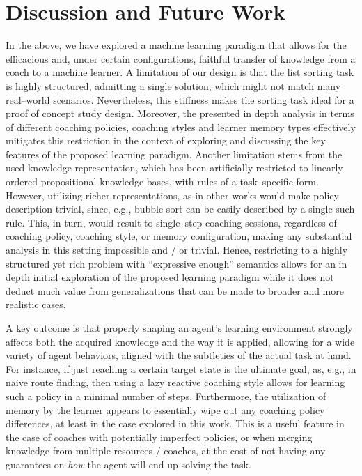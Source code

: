 \documentclass[a4paper,twoside]{article}
\begin{document}
\section{Discussion and Future Work}\label{sec:discussion-and-future-work}
%
In the above, we have explored a machine learning paradigm that allows for the efficacious and, under certain configurations, faithful transfer of knowledge from a coach to a machine learner. A limitation of our design is that the list sorting task is highly structured, admitting a single solution, which might not match many real--world scenarios. Nevertheless, this stiffness makes the sorting task ideal for a proof of concept study design. Moreover, the presented in depth analysis in terms of different coaching policies, coaching styles and learner memory types effectively mitigates this restriction in the context of exploring and discussing the key features of the proposed learning paradigm. Another limitation stems from the used knowledge representation, which has been artificially restricted to linearly ordered propositional knowledge bases, with rules of a task--specific form. However, utilizing richer representations, as in other works \cite{michaelMachineCoaching2019,prudens2022,ioannouKnowledgeBasedTranslationNatural2021} would make policy description trivial, since, e.g., bubble sort can be easily described by a single such rule. This, in turn, would result to single--step coaching sessions, regardless of coaching policy, coaching style, or memory configuration, making any substantial analysis in this setting impossible and / or trivial. Hence, restricting to a highly structured yet rich problem with ``expressive enough'' semantics allows for an in depth initial exploration of the proposed learning paradigm while it does not deduct much value from generalizations that can be made to broader and more realistic cases.

A key outcome is that properly shaping an agent's learning environment strongly affects both the acquired knowledge and the way it is applied, allowing for a wide variety of agent behaviors, aligned with the subtleties of the actual task at hand. For instance, if just reaching a certain target state is the ultimate goal, as, e.g., in naive route finding, then using a lazy reactive coaching style allows for learning such a policy in a minimal number of steps. Furthermore, the utilization of memory by the learner appears to essentially wipe out any coaching policy differences, at least in the case explored in this work. This is a useful feature in the case of coaches with potentially imperfect policies, or when merging knowledge from multiple resources / coaches, at the cost of not having any guarantees on \emph{how} the agent will end up solving the task.
\end{document}
